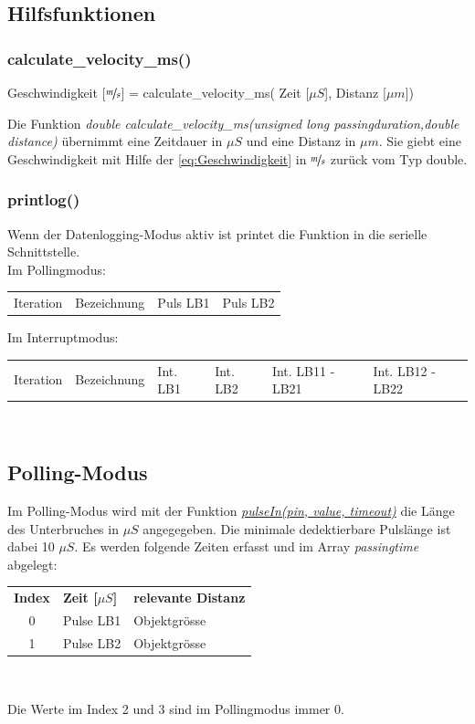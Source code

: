 \subsection{Hilfsfunktionen}
\subsubsection{calculate\_velocity\_ms()}\label{subsubsec:calcvel}
\begin{center}
    Geschwindigkeit [$\nicefrac{m}{s}$] = calculate\_velocity\_ms( Zeit [$\mu S$], Distanz [$\mu m$])
\end{center}

Die Funktion \textit{double calculate\_velocity\_ms(unsigned long passingduration,double distance)} übernimmt eine Zeitdauer in $\mu S$ und eine Distanz in $\mu m$.
Sie giebt eine Geschwindigkeit mit Hilfe der \ref{eq:Geschwindigkeit} in $\nicefrac{m}{s}$ zurück vom Typ double.\\


\subsubsection{printlog()}
Wenn der Datenlogging-Modus aktiv ist printet die Funktion in die serielle Schnittstelle.\\
Im Pollingmodus:\\
\begin{tabular}{llll}
    Iteration&Bezeichnung& Puls LB1 & Puls LB2\\
\end{tabular}

Im Interruptmodus:\\
\begin{tabular}{llllll}
    Iteration&Bezeichnung& Int. LB1 & Int. LB2& Int. LB11 - LB21& Int. LB12 - LB22\\
\end{tabular}\\

\clearpage
\subsection{Polling-Modus}\label{subsec:polling}
Im  Polling-Modus wird mit der Funktion \textit{\href{https://www.arduino.cc/reference/en/language/functions/advanced-io/pulsein/}{pulseIn(pin, value, timeout)}} die Länge des Unterbruches in $\mu S$ angegegeben. Die minimale dedektierbare Pulslänge ist dabei 10 $\mu S$.
Es werden folgende Zeiten erfasst und im Array \textit{passingtime} abgelegt:
\begin{center}
    \begin{tabular}{cll}
        \textbf{Index}&\textbf{Zeit [$\mu S$]} & \textbf{relevante Distanz} \\
        0&Pulse LB1 & Objektgrösse\\
        1&Pulse LB2 & Objektgrösse\\
    \end{tabular}\\
\end{center}
Die Werte im Index 2 und 3 sind im Pollingmodus immer 0.\\

